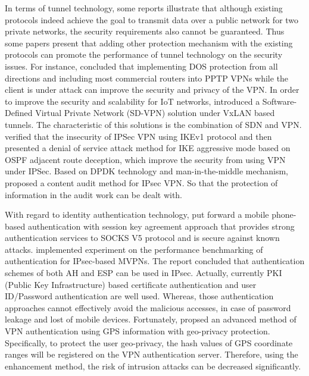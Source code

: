 \documentclass[12pt]{article} %
\begin{document}
In terms of tunnel technology, some reports illustrate that although existing protocols indeed achieve the goal to transmit data over a public network for two private networks, the security requirements also cannot be guaranteed. Thus some papers present that adding other protection mechanism with the existing protocols can promote the performance of tunnel technology on the security issues. For instance, \cite{9020514} concluded that implementing DOS protection from all directions and including most commercial routers into PPTP VPNs while the client is under attack can improve the security and privacy of the VPN. In order to improve the security and scalability for IoT networks, \cite{8406192} introduced a Software-Defined Virtual Private Network (SD-VPN) solution under VxLAN based tunnels. The characteristic of this solutions is the combination of SDN and VPN. \cite{9182437} verified that the insecurity of IPSec VPN using IKEv1 protocol and then presented a denial of service attack method for IKE aggressive mode based on OSPF adjacent route deception, which improve the security from using VPN under IPSec. Based on DPDK technology and man-in-the-middle mechanism, \cite{8411922} proposed a content audit method for IPsec VPN. So that the protection of information in the audit work can be dealt with. 

With regard to identity authentication technology, \cite{7492654} put forward a mobile phone-based authentication with session key agreement approach that provides strong authentication services to SOCKS V5 protocol and is secure against known attacks. \cite{6296089} implemented experiment on the performance benchmarking of authentication for IPsec-based MVPNs. The report concluded that authentication schemes of both AH and ESP can be used in IPsec.  Actually, currently PKI (Public Key Infrastructure) based certificate authentication and user ID/Password authentication are well used. Whereas, those authentication approaches cannot effectively avoid the malicious accesses, in case of password leakage and lost of mobile devices. Fortunately, \cite{7568518} propsed an advanced method of VPN authentication using GPS information with geo-privacy protection. Specifically, to protect the user geo-privacy, the hash values of GPS coordinate ranges will be registered on the VPN authentication server. Therefore, using the enhancement method, the risk of intrusion attacks can be decreased significantly.
\end{document}
